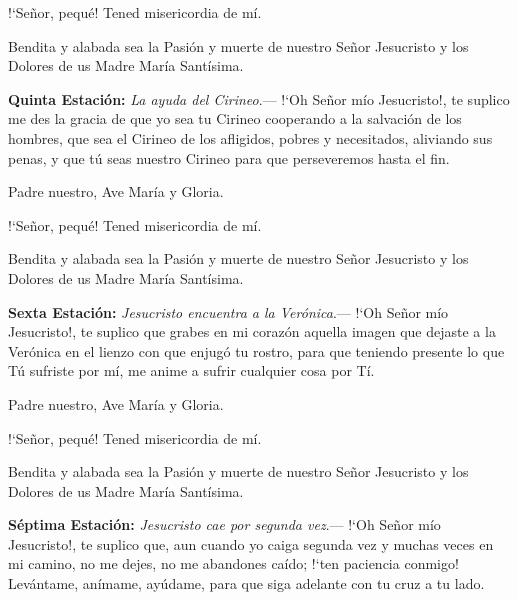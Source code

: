 \documentclass[10pt]{article}
\begin{document}
\begin{multicols}{2}
      {!`}Señor, pequé! Tened misericordia de mí.

      Bendita y alabada sea la Pasión y muerte de nuestro Señor Jesucristo y los Dolores de us Madre María Santísima.

      \vspace{2mm}

      \textbf{Quinta Estación:} \textit{La ayuda del Cirineo}.--- {!`}Oh Señor mío Jesucristo!, te suplico me des la gracia de que yo sea tu Cirineo cooperando a la
      salvación de los hombres, que sea el Cirineo de los afligidos, pobres y necesitados, aliviando sus penas, y que tú seas nuestro Cirineo para que perseveremos hasta el fin.

      \vspace{2mm}

      Padre nuestro, Ave María y Gloria.

      {!`}Señor, pequé! Tened misericordia de mí.

      Bendita y alabada sea la Pasión y muerte de nuestro Señor Jesucristo y los Dolores de us Madre María Santísima.

      \vspace{2mm}

      \textbf{Sexta Estación:} \textit{Jesucristo encuentra a la Verónica}.--- {!`}Oh Señor mío Jesucristo!, te suplico que grabes en mi corazón aquella imagen que dejaste a la Verónica
      en el lienzo con que enjugó tu rostro, para que teniendo presente lo que Tú sufriste por mí, me anime a sufrir cualquier cosa por Tí.

      \vspace{2mm}

      Padre nuestro, Ave María y Gloria.

      {!`}Señor, pequé! Tened misericordia de mí.

      Bendita y alabada sea la Pasión y muerte de nuestro Señor Jesucristo y los Dolores de us Madre María Santísima.

      \vspace{2mm}

      \textbf{Séptima Estación:} \textit{Jesucristo cae por segunda vez}.--- {!`}Oh Señor mío Jesucristo!, te suplico que, aun cuando yo caiga segunda vez y muchas veces en mi camino, no me dejes,
      no me abandones caído; {!`}ten paciencia conmigo! Levántame, anímame, ayúdame, para que siga adelante con tu cruz a tu lado.

      \vspace{2mm}


\end{multicols}
\end{document}
